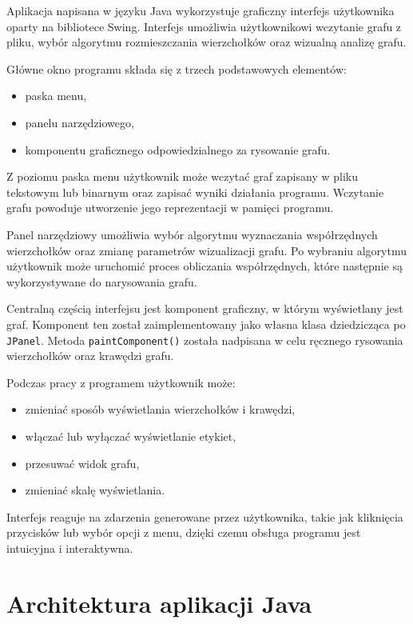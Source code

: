 \documentclass[11pt,a4paper]{article}
\begin{document}
Aplikacja napisana w języku Java wykorzystuje graficzny interfejs użytkownika oparty na bibliotece Swing. Interfejs umożliwia użytkownikowi wczytanie grafu z pliku, wybór algorytmu rozmieszczania wierzchołków oraz wizualną analizę grafu.

Główne okno programu składa się z trzech podstawowych elementów:

\begin{itemize}
    \item paska menu,
    \item panelu narzędziowego,
    \item komponentu graficznego odpowiedzialnego za rysowanie grafu.
\end{itemize}

Z poziomu paska menu użytkownik może wczytać graf zapisany w pliku tekstowym lub binarnym oraz zapisać wyniki działania programu. Wczytanie grafu powoduje utworzenie jego reprezentacji w pamięci programu.

Panel narzędziowy umożliwia wybór algorytmu wyznaczania współrzędnych wierzchołków oraz zmianę parametrów wizualizacji grafu. Po wybraniu algorytmu użytkownik może uruchomić proces obliczania współrzędnych, które następnie są wykorzystywane do narysowania grafu.

Centralną częścią interfejsu jest komponent graficzny, w którym wyświetlany jest graf. Komponent ten został zaimplementowany jako własna klasa dziedzicząca po \verb|JPanel|. Metoda \verb|paintComponent()| została nadpisana w celu ręcznego rysowania wierzchołków oraz krawędzi grafu.

Podczas pracy z programem użytkownik może:

\begin{itemize}
    \item zmieniać sposób wyświetlania wierzchołków i krawędzi,
    \item włączać lub wyłączać wyświetlanie etykiet,
    \item przesuwać widok grafu,
    \item zmieniać skalę wyświetlania.
\end{itemize}

Interfejs reaguje na zdarzenia generowane przez użytkownika, takie jak kliknięcia przycisków lub wybór opcji z menu, dzięki czemu obsługa programu jest intuicyjna i interaktywna.

\section{Architektura aplikacji Java}
\end{document}
